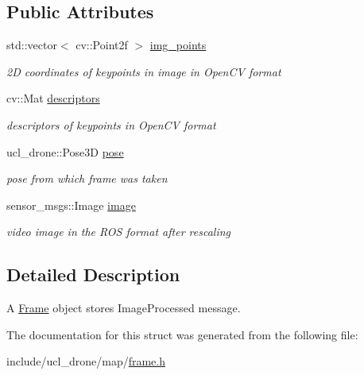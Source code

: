 \subsection*{Public Attributes}
\begin{DoxyCompactItemize}
\item 
\mbox{\label{structFrame_aac79e8043bbfe9452cdb9ca3ba88f87f}} 
std\+::vector$<$ cv\+::\+Point2f $>$ \hyperlink{structFrame_aac79e8043bbfe9452cdb9ca3ba88f87f}{img\+\_\+points}
\begin{DoxyCompactList}\small\item\em 2D coordinates of keypoints in image in Open\+CV format \end{DoxyCompactList}\item 
\mbox{\label{structFrame_a358eda120b8420754f30f69007e9fecb}} 
cv\+::\+Mat \hyperlink{structFrame_a358eda120b8420754f30f69007e9fecb}{descriptors}
\begin{DoxyCompactList}\small\item\em descriptors of keypoints in Open\+CV format \end{DoxyCompactList}\item 
\mbox{\label{structFrame_a883305db1380185b86ff2179e15ed1fb}} 
ucl\+\_\+drone\+::\+Pose3D \hyperlink{structFrame_a883305db1380185b86ff2179e15ed1fb}{pose}
\begin{DoxyCompactList}\small\item\em pose from which frame was taken \end{DoxyCompactList}\item 
\mbox{\label{structFrame_ad9f543b70f36f55579544b5922487236}} 
sensor\+\_\+msgs\+::\+Image \hyperlink{structFrame_ad9f543b70f36f55579544b5922487236}{image}
\begin{DoxyCompactList}\small\item\em video image in the R\+OS format after rescaling \end{DoxyCompactList}\end{DoxyCompactItemize}


\subsection{Detailed Description}
A \hyperlink{structFrame}{Frame} object stores Image\+Processed message. 

The documentation for this struct was generated from the following file\+:\begin{DoxyCompactItemize}
\item 
include/ucl\+\_\+drone/map/\hyperlink{frame_8h}{frame.\+h}\end{DoxyCompactItemize}
